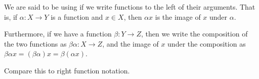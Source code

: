 \documentclass{article}
\begin{document}
We are said to be using {}
if we write functions to the left of their arguments.
That is, if $\alpha : X \to Y$ is a function and $x \in X$,
then $\alpha x$ is the image of $x$ under $\alpha$.

Furthermore, if we have a function $\beta : Y \to Z$,
then we write the composition of the two functions
as $\beta \alpha : X \to Z$,
and the image of $x$ under the composition
as $\beta \alpha x = (\beta \alpha) x = \beta(\alpha x)$.

Compare this to right function notation.
\end{document}
